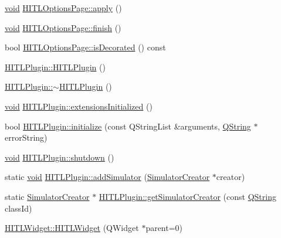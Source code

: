 \begin{DoxyCompactItemize}
\item 
\hyperlink{group___u_a_v_objects_plugin_ga444cf2ff3f0ecbe028adce838d373f5c}{void} \hyperlink{group___h_i_t_l_plugin_ga6554b77636be9ff76148c91411929d4a}{H\-I\-T\-L\-Options\-Page\-::apply} ()
\item 
\hyperlink{group___u_a_v_objects_plugin_ga444cf2ff3f0ecbe028adce838d373f5c}{void} \hyperlink{group___h_i_t_l_plugin_ga2a1b2e14f1c4d4cd1c5f63c1c906f06d}{H\-I\-T\-L\-Options\-Page\-::finish} ()
\item 
bool \hyperlink{group___h_i_t_l_plugin_ga0f6209b81c7a24419e848b6740d72f24}{H\-I\-T\-L\-Options\-Page\-::is\-Decorated} () const 
\item 
\hyperlink{group___h_i_t_l_plugin_ga0f1bfd313d4d0d404f51e34d8dbaacc5}{H\-I\-T\-L\-Plugin\-::\-H\-I\-T\-L\-Plugin} ()
\item 
\hyperlink{group___h_i_t_l_plugin_ga371454242ad0b7e52024243ec91c7d13}{H\-I\-T\-L\-Plugin\-::$\sim$\-H\-I\-T\-L\-Plugin} ()
\item 
\hyperlink{group___u_a_v_objects_plugin_ga444cf2ff3f0ecbe028adce838d373f5c}{void} \hyperlink{group___h_i_t_l_plugin_ga30d63de205d36f5e637e17ae3efb35cd}{H\-I\-T\-L\-Plugin\-::extensions\-Initialized} ()
\item 
bool \hyperlink{group___h_i_t_l_plugin_ga113a69fc6f312ce4658d3c6266e3545f}{H\-I\-T\-L\-Plugin\-::initialize} (const Q\-String\-List \&arguments, \hyperlink{group___u_a_v_objects_plugin_gab9d252f49c333c94a72f97ce3105a32d}{Q\-String} $\ast$error\-String)
\item 
\hyperlink{group___u_a_v_objects_plugin_ga444cf2ff3f0ecbe028adce838d373f5c}{void} \hyperlink{group___h_i_t_l_plugin_gadc35670ca57c30770f97bf6e95e9297b}{H\-I\-T\-L\-Plugin\-::shutdown} ()
\item 
static \hyperlink{group___u_a_v_objects_plugin_ga444cf2ff3f0ecbe028adce838d373f5c}{void} \hyperlink{group___h_i_t_l_plugin_ga54ec8bdd017e6c77dc8f88009474d78e}{H\-I\-T\-L\-Plugin\-::add\-Simulator} (\hyperlink{class_simulator_creator}{Simulator\-Creator} $\ast$creator)
\item 
static \hyperlink{class_simulator_creator}{Simulator\-Creator} $\ast$ \hyperlink{group___h_i_t_l_plugin_gad74c7b21a8be7419684135b3f0498b01}{H\-I\-T\-L\-Plugin\-::get\-Simulator\-Creator} (const \hyperlink{group___u_a_v_objects_plugin_gab9d252f49c333c94a72f97ce3105a32d}{Q\-String} class\-Id)
\item 
\hyperlink{group___h_i_t_l_plugin_ga87da797826b0d587d7ed590e61741ca6}{H\-I\-T\-L\-Widget\-::\-H\-I\-T\-L\-Widget} (Q\-Widget $\ast$parent=0)

\end{DoxyCompactItemize}
